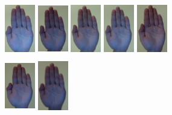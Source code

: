 \documentclass[12pt]{article}
\begin{document}
\noindent\begin{figure}[H]
\centering
\includegraphics[width=50px, height=90px]{../data/positives/img0000.jpg}
\includegraphics[width=50px, height=90px]{../data/positives/img0001.jpg}
\includegraphics[width=50px, height=90px]{../data/positives/img0002.jpg}
\includegraphics[width=50px, height=90px]{../data/positives/img0003.jpg}
\includegraphics[width=50px, height=90px]{../data/positives/img0004.jpg} \\
\includegraphics[width=50px, height=90px]{../data/positives/img0005.jpg}
\includegraphics[width=50px, height=90px]{../data/positives/img0006.jpg}

\end{figure}
\end{document}

